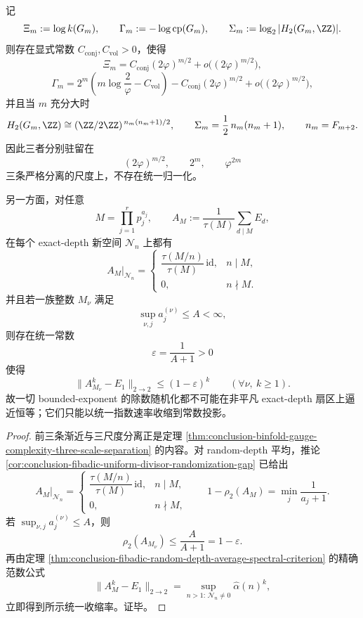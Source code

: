 \begin{theorem}\label{thm:conclusion-window6-representation-scales-vs-bounded-depth-contraction}
记
\[
\Xi_m:=\log k(G_m),
\qquad
\Gamma_m:=-\log \mathrm{cp}(G_m),
\qquad
\Sigma_m:=\log_2|H_2(G_m,\ZZ)|.
\]
则存在显式常数 \(C_{\mathrm{conj}},C_{\mathrm{vol}}>0\)，使得
\[
\Xi_m
=
C_{\mathrm{conj}}(2\varphi)^{m/2}
+o\!\bigl((2\varphi)^{m/2}\bigr),
\]
\[
\Gamma_m
=
2^m\left(m\log\frac{2}{\varphi}-C_{\mathrm{vol}}\right)
-C_{\mathrm{conj}}(2\varphi)^{m/2}
+o\!\bigl((2\varphi)^{m/2}\bigr),
\]
并且当 \(m\) 充分大时
\[
H_2(G_m,\ZZ)\cong (\ZZ/2\ZZ)^{\,n_m(n_m+1)/2},
\qquad
\Sigma_m=\frac12\,n_m(n_m+1),
\qquad
n_m=F_{m+2}.
\]
因此三者分别驻留在
\[
(2\varphi)^{m/2},\qquad 2^m,\qquad \varphi^{2m}
\]
三条严格分离的尺度上，不存在统一归一化。

另一方面，对任意
\[
M=\prod_{j=1}^{r}p_j^{a_j},
\qquad
A_M:=\frac1{\tau(M)}\sum_{d\mid M}E_d,
\]
在每个 exact-depth 新空间 \(\mathcal N_n\) 上都有
\[
A_M|_{\mathcal N_n}
=
\begin{cases}
\dfrac{\tau(M/n)}{\tau(M)}\,\mathrm{id}, & n\mid M,\\[1ex]
0, & n\nmid M.
\end{cases}
\]
并且若一族整数 \(M_\nu\) 满足
\[
\sup_{\nu,j}a_j^{(\nu)}\le A<\infty,
\]
则存在统一常数
\[
\varepsilon=\frac1{A+1}>0
\]
使得
\[
\|A_{M_\nu}^k-E_1\|_{2\to 2}\le (1-\varepsilon)^k
\qquad(\forall \nu,\ k\ge 1).
\]
故一切 bounded-exponent 的除数随机化都不可能在非平凡 exact-depth 扇区上逼近恒等；它们只能以统一指数速率收缩到常数投影。
\end{theorem}
\begin{proof}
前三条渐近与三尺度分离正是定理 \ref{thm:conclusion-binfold-gauge-complexity-three-scale-separation} 的内容。对 random-depth 平均，推论 \ref{cor:conclusion-fibadic-uniform-divisor-randomization-gap} 已给出
\[
A_M|_{\mathcal N_n}
=
\begin{cases}
\dfrac{\tau(M/n)}{\tau(M)}\,\mathrm{id}, & n\mid M,\\[1ex]
0, & n\nmid M,
\end{cases}
\qquad
1-\rho_2(A_M)=\min_j\frac1{a_j+1}.
\]
若 \(\sup_{\nu,j}a_j^{(\nu)}\le A\)，则
\[
\rho_2(A_{M_\nu})\le \frac{A}{A+1}=1-\varepsilon.
\]
再由定理 \ref{thm:conclusion-fibadic-random-depth-average-spectral-criterion} 的精确范数公式
\[
\|A_M^k-E_1\|_{2\to 2}
=
\sup_{n>1:\,\mathcal N_n\neq 0}\widehat\alpha(n)^k,
\]
立即得到所示统一收缩率。证毕。
\end{proof}

